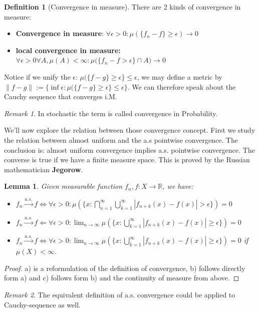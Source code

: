 \documentclass[a4paper,11pt,oneside,fleqn]{book}
\newtheorem{lemma}[theorem]{Lemma}
\theoremstyle{definition}
\newtheorem{definition}{Definition}[section]
\theoremstyle{remark}
\newtheorem*{remark}{Remark}
\begin{document}
\begin{definition}[Convergence in measure]
There are 2 kinds of convergence in measure:
\begin{itemize}
	\item \textbf{Convergence in measure}: $\forall \epsilon > 0: \mu(\{f_n - f\} \geq \epsilon ) \rightarrow 0$
	\item \textbf{local convergence in measure:} $\forall \epsilon > 0 \forall A, \mu(A) < \infty: \mu \bigg(\{f_n - f > \epsilon\} \cap A \bigg) \rightarrow 0$
\end{itemize}
Notice if we unify the $\epsilon$: $\mu( \{f - g\} \geq \epsilon \} \leq \epsilon$, we may define a metric by $\|f - g\| := \{\inf \epsilon :  \mu( \{f - g\} \geq \epsilon \} \leq \epsilon\}$. We can therefore speak about the Cauchy sequence that converges i.M. 
\end{definition}
\begin{remark}
In stochastic the term is called convergence in Probability.	
\end{remark}


We'll now explore the relation between those convergence concept. First we study the relation between almost uniform and the a.s pointwise convergence. The conclusion is: almost uniform convergence implies a.s. pointwise convergence. The converse is true if we have a finite measure space. This is proved by the Russian mathematician \textbf{Jegorow}.

\begin{lemma}
	Given measurable function $f_n, f : X \rightarrow \mathbb{R}$, we have:
	\begin{itemize}
		\item $f_n \overset{a.s.}{\rightarrow} f \Leftrightarrow \forall \epsilon > 0:
		  \mu( \{x:   \bigcap_{n = 1}^\infty  \bigcup_{k = 1}^\infty |f_{n + k}(x) - f(x)| > \epsilon \}) = 0 $
		  \item $f_n \overset{a.s.}{\rightarrow} f \Leftarrow \forall \epsilon > 0 : \lim_{n \rightarrow \infty} \mu(\{x: \bigcup_{k = 1}^\infty | f_{n+k}(x) - f(x)| \geq \epsilon \}) = 0 $
		  \item $f_n \overset{a.s.}{\rightarrow} f \Leftrightarrow \forall \epsilon > 0  : \lim_{n \rightarrow \infty} \mu(\{x: \bigcup_{k = 1}^\infty | f_{n+k}(x) - f(x)| \geq \epsilon \}) = 0 $ if $\mu(X) < \infty$.		  
	\end{itemize}
\end{lemma}
\begin{proof}
	a) is a reformulation of the definition of convergence, b) follows directly form a) and c) follows form b) and the continuity of measure from above. 
\end{proof}
\begin{remark}
The equivalent definition of a.s. convergence could be applied to Cauchy-sequence as well.	
\end{remark}
\end{document}
